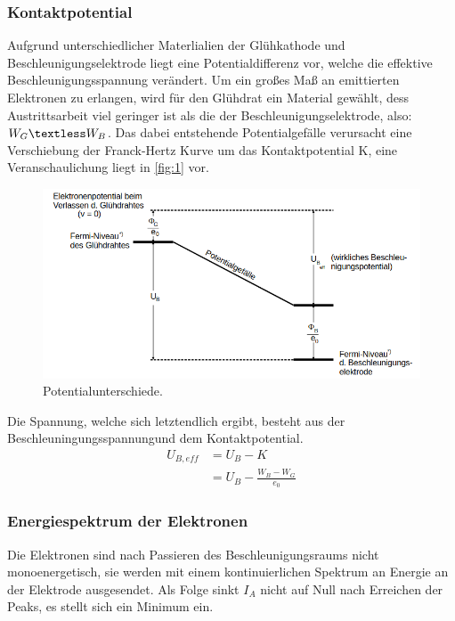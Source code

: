 \subsubsection{Kontaktpotential}
Aufgrund unterschiedlicher Materlialien der Glühkathode und Beschleunigungselektrode 
liegt eine Potentialdifferenz vor, welche die effektive Beschleunigungsspannung 
verändert. Um ein großes Maß an emittierten Elektronen zu erlangen, wird für 
den Glühdrat ein Material gewählt, dess Austrittsarbeit viel geringer ist als 
die der Beschleunigungselektrode, also: $W_G \textless W_B$. Das dabei 
entstehende Potentialgefälle verursacht eine Verschiebung der Franck-Hertz 
Kurve um das Kontaktpotential K, eine Veranschaulichung liegt in \autoref{fig:1}
vor.
\begin{figure}[H]
    \centering
        \centering
        \includegraphics[width=\textwidth]{Bilder/kp.png}
        \caption{Potentialunterschiede. \cite{anleitung5}}
    \hfill
    \label{fig:1}
\end{figure}
\noindent Die Spannung, welche sich letztendlich ergibt, besteht aus der
Beschleuningungsspannungund dem Kontaktpotential.
\begin{align}
    U_{B,eff} &= U_B - K \\
              &= U_B - \frac{W_B-W_G}{e_0}
\end{align}

\subsubsection{Energiespektrum der Elektronen}
Die Elektronen sind nach Passieren des Beschleunigungsraums nicht monoenergetisch,
sie werden mit einem kontinuierlichen Spektrum an Energie an der Elektrode 
ausgesendet. Als Folge sinkt $I_A$ nicht auf Null nach Erreichen der Peaks, 
es stellt sich ein Minimum ein.

